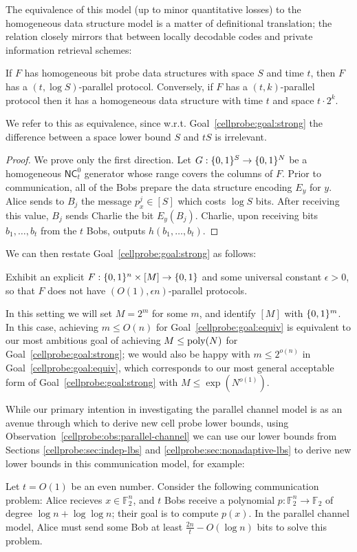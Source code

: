 The equivalence of this model (up to minor quantitative losses) to the homogeneous data structure model is a matter of definitional translation; the relation closely mirrors that between locally decodable codes and private information retrieval schemes:
\begin{observation}\label{cellprobe:obs:parallel-channel}
If $F$ has homogeneous bit probe data structures with space $S$ and time $t$, then $F$ has a $(t,\log S)$-parallel protocol. Conversely, if $F$ has a $(t,k)$-parallel protocol then it has a homogeneous data structure with time $t$ and space $t\cdot 2^k$.
\end{observation}
We refer to this as equivalence, since w.r.t. Goal~\ref{cellprobe:goal:strong} the difference between a space lower bound $S$ and $tS$ is irrelevant. 
\begin{proof}
We prove only the first direction. Let $G: \{0,1\}^S \to \{0,1\}^N$ be a homogeneous $\mathsf{NC}^0_t$ generator whose range covers the columns of $F$. Prior to communication, all of the Bobs prepare the data structure encoding $E_y$ for $y$. Alice sends to $B_j$ the message $p_x^j\in [S]$ which costs $\log S$ bits. After receiving this value, $B_j$ sends Charlie the bit $E_y(B_j)$. Charlie, upon receiving bits $b_1,\ldots,b_t$ from the $t$ Bobs, outputs $h(b_1,\ldots,b_t)$.
\end{proof}
We can then restate Goal~\ref{cellprobe:goal:strong} as follows:
\begin{goal}\label{cellprobe:goal:equiv}
Exhibit an explicit $F: \{0,1\}^n \times [M] \to \{0,1\}$ and some universal constant $\epsilon>0$, so that $F$ does not have $(O(1),\epsilon n)$-parallel protocols.
\end{goal}
In this setting we will set $M = 2^m$ for some $m$, and identify $[M]$ with $\{0,1\}^m$. In this case, achieving $m \leq O(n)$ for Goal~\ref{cellprobe:goal:equiv} is equivalent to our most ambitious goal of achieving $M \leq \mathrm{poly}(N)$ for Goal~\ref{cellprobe:goal:strong}; we would also be happy with $m \leq 2^{o(n)}$ in Goal~\ref{cellprobe:goal:equiv}, which corresponds to our most general acceptable form of Goal~\ref{cellprobe:goal:strong} with $M \leq \exp(N^{o(1)})$.

While our primary intention in investigating the parallel channel model is as an avenue through which to derive new cell probe lower bounds, using Observation~\ref{cellprobe:obs:parallel-channel} we can use our lower bounds from Sections \ref{cellprobe:sec:indep-lbs} and \ref{cellprobe:sec:nonadaptive-lbs} to derive new lower bounds in this communication model, for example:
\begin{lemma}
Let $t= O(1)$ be an even number. Consider the following communication problem: Alice recieves $x \in \mathbb{F}_2^n$, and $t$ Bobs receive a polynomial $p:\mathbb{F}_2^n \to \mathbb{F}_2$ of degree $\log n + \log\log n$; their goal is to compute $p(x)$. In the parallel channel model, Alice must send some Bob at least $\frac{2n}{t} - O(\log n)$ bits to solve this problem.
\end{lemma}

